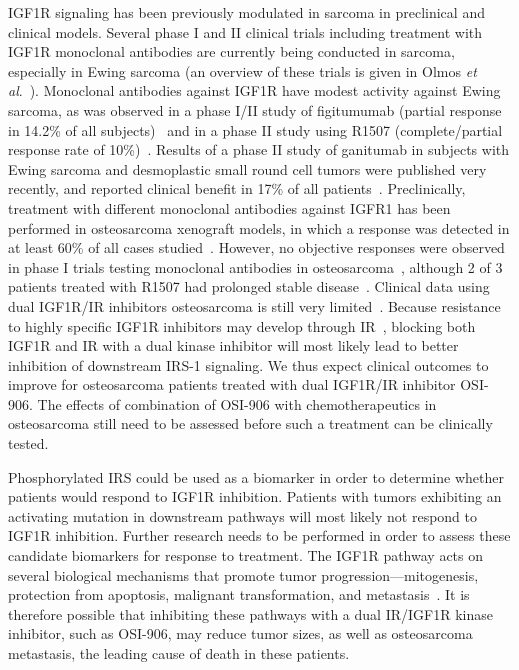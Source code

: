 IGF1R signaling has been previously modulated in sarcoma in preclinical and clinical models. Several phase I and II clinical trials including treatment with IGF1R monoclonal antibodies are currently being conducted in sarcoma, especially in Ewing sarcoma (an overview of these trials is given in Olmos {\it et al}.~\cite{olmos2010biological}). Monoclonal antibodies against IGF1R have modest activity against Ewing sarcoma, as was observed in a phase I/II study of figitumumab (partial response in 14.2\% of all subjects)~\cite{juergens2011preliminary} and in a phase II study using R1507 (complete/partial response rate of 10\%)~\cite{pappo2011r1507}. Results of a phase II study of ganitumab in subjects with Ewing sarcoma and desmoplastic small round cell tumors were published very recently, and reported clinical benefit in 17\% of all patients~\cite{tap2012phase}. Preclinically, treatment with different monoclonal antibodies against IGFR1 has been performed in osteosarcoma xenograft models, in which a response was detected in at least 60\% of all cases studied~\cite{kolb2010r1507,kolb2008initial,houghton2010initial}. However, no objective responses were observed in phase I trials testing monoclonal antibodies in osteosarcoma~\cite{juergens2011preliminary,bagatell2011pharmacokinetically,quek2010combination}, although 2 of 3 patients treated with R1507 had prolonged stable disease~\cite{bagatell2011pharmacokinetically}. Clinical data using dual IGF1R/IR inhibitors osteosarcoma is still very limited~\cite{desai2010phase}. Because resistance to highly specific IGF1R inhibitors may develop through IR~\cite{garofalo2011efficacy}, blocking both IGF1R and IR with a dual kinase inhibitor will most likely lead to better inhibition of downstream IRS-1 signaling. We thus expect clinical outcomes to improve for osteosarcoma patients treated with dual IGF1R/IR inhibitor OSI-906. The effects of combination of OSI-906 with chemotherapeutics in osteosarcoma still need to be assessed before such a treatment can be clinically tested.

Phosphorylated IRS could be used as a biomarker in order to determine whether patients would respond to IGF1R inhibition. Patients with tumors exhibiting an activating mutation in downstream pathways will most likely not respond to IGF1R inhibition. Further research needs to be performed in order to assess these candidate biomarkers for response to treatment. The IGF1R pathway acts on several biological mechanisms that promote tumor progression---mitogenesis, protection from apoptosis, malignant transformation, and metastasis~\cite{rikhof2009insulin}. It is therefore possible that inhibiting these pathways with a dual IR/IGF1R kinase inhibitor, such as OSI-906, may reduce tumor sizes, as well as osteosarcoma metastasis, the leading cause of death in these patients.

